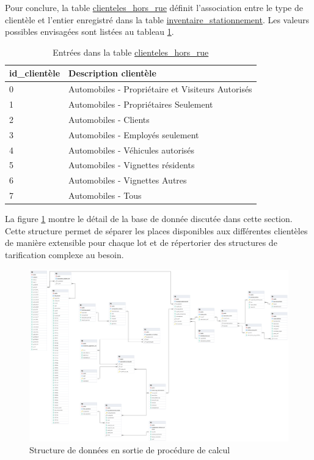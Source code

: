     Pour conclure, la table \underline{clienteles\_hors\_rue} définit l'association entre le type de clientèle et l'entier enregistré dans la table \underline{inventaire\_stationnement}. Les valeurs possibles envisagées sont listées au tableau \ref{tab:clienteles_hors_rue}.
    \begin{table}
    \centering
    \begin{tabular}{l l}
    \hline
    id\_clientèle & Description clientèle\\ \hline
    0& Automobiles - Propriétaire et Visiteurs Autorisés \\
    1 & Automobiles - Propriétaires Seulement \\
    2 & Automobiles - Clients \\
    3 & Automobiles - Employés seulement \\
    4 & Automobiles - Véhicules autorisés \\
    5 & Automobiles - Vignettes résidents \\
    6 & Automobiles - Vignettes Autres \\
    7 & Automobiles - Tous\\ \hline
    \end{tabular}
    \caption{Entrées dans la table \underline{clienteles\_hors\_rue}}\label{tab:clienteles_hors_rue}
    \end{table}
    \FloatBarrier
    La figure \ref{fig:offstreet_db_erd_output} montre le détail de la base de donnée discutée dans cette section. Cette structure permet de séparer les places disponibles aux différentes clientèles de manière extensible pour chaque lot et de répertorier des structures de tarification complexe au besoin.
    \begin{figure}[!h]
        \centering
        \includegraphics[trim={50cm 48cm 0 0}, clip, width=14cm]{images/structure_base_de_donnee.png}
        \caption{Structure de données en sortie de procédure de calcul}\label{fig:offstreet_db_erd_output}
    \end{figure}
    \FloatBarrier

